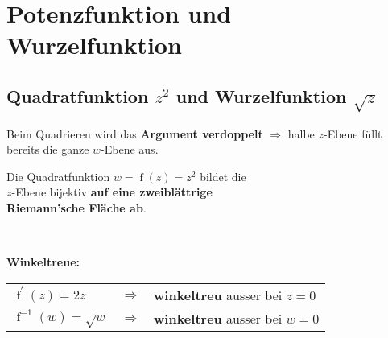 \section{Potenzfunktion und Wurzelfunktion}
	\subsection{Quadratfunktion $z^2$ und Wurzelfunktion $\sqrt{z}$}
		Beim Quadrieren wird das \textbf{Argument verdoppelt} $\Rightarrow$ halbe $z$-Ebene füllt bereits die ganze $w$-Ebene aus.\\[3pt]
		
		\begin{minipage}[t]{0.5\textwidth}
			\begin{framed}
				Die Quadratfunktion $w = \operatorname{f}\left( z \right) = z^2$ bildet die\\[3pt]
				$z$-Ebene bijektiv \textbf{auf eine zweiblättrige\\[3pt] Riemann'sche Fläche ab}.
			\end{framed}
		\end{minipage}
		\begin{minipage}[t]{0.5\textwidth}
			
		\end{minipage}\\[3pt]
		\begin{minipage}[t]{0.2\textwidth}
			\textbf{Winkeltreue:}
		\end{minipage}
		\begin{minipage}[t]{0.5\textwidth}
			\begin{framed}
				\begin{tabular}{lll}
					$\operatorname{f}^{\prime}\left( z \right) = 2 z$ & $\Rightarrow$ & \textbf{winkeltreu} ausser bei $z = 0$\\[3pt]
					$\operatorname{f}^{-1}\left( w \right) = \sqrt{w}$ & $\Rightarrow$ & \textbf{winkeltreu} ausser bei $w = 0$\\[3pt]
				\end{tabular}
			\end{framed}
		\end{minipage}
		\begin{minipage}[t]{0.3\textwidth}
			
		\end{minipage}\\[3pt]
	
